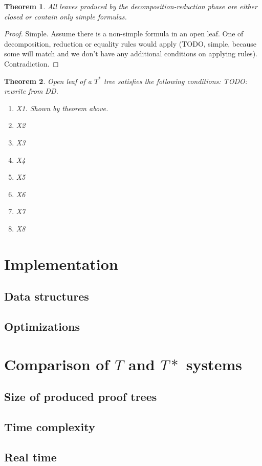 \documentclass{article}
\newtheorem{theorem}{Theorem}
\theoremstyle{definition}
\newcommand*{\Ts}{T^*}
\begin{document}
\begin{theorem}
    All leaves produced by the decomposition-reduction phase are either closed or contain only simple formulas.
\end{theorem}
\begin{proof}
    Simple. Assume there is a non-simple formula in an open leaf. One of decomposition, reduction or equality rules would apply (TODO, simple, because some will match and we don't have any additional conditions on applying rules). Contradiction.
\end{proof}

\begin{theorem}
    Open leaf of a $\Ts$ tree satisfies the following conditions:
    TODO: rewrite from DD.
    \begin{enumerate}
        \item X1. Shown by theorem above.
        \item X2
        \item X3
        \item X4
        \item X5
        \item X6
        \item X7
        \item X8
    \end{enumerate}
\end{theorem}

\section{Implementation}
\subsection{Data structures}
\subsection{Optimizations}
\section{Comparison of $T$ and $T*$ systems}
\subsection{Size of produced proof trees}
\subsection{Time complexity}
\subsection{Real time}
\end{document}
